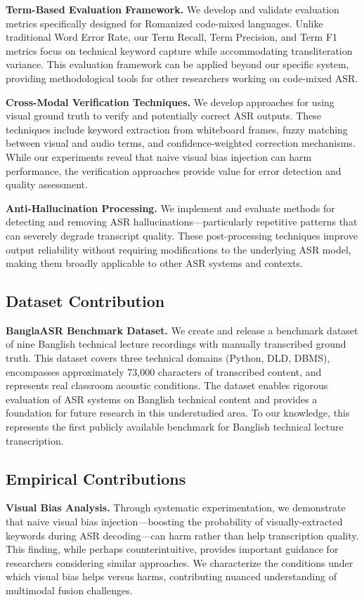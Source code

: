 \textbf{Term-Based Evaluation Framework.} We develop and validate evaluation metrics specifically designed for Romanized code-mixed languages. Unlike traditional Word Error Rate, our Term Recall, Term Precision, and Term F1 metrics focus on technical keyword capture while accommodating transliteration variance. This evaluation framework can be applied beyond our specific system, providing methodological tools for other researchers working on code-mixed ASR.

\textbf{Cross-Modal Verification Techniques.} We develop approaches for using visual ground truth to verify and potentially correct ASR outputs. These techniques include keyword extraction from whiteboard frames, fuzzy matching between visual and audio terms, and confidence-weighted correction mechanisms. While our experiments reveal that naive visual bias injection can harm performance, the verification approaches provide value for error detection and quality assessment.

\textbf{Anti-Hallucination Processing.} We implement and evaluate methods for detecting and removing ASR hallucinations---particularly repetitive patterns that can severely degrade transcript quality. These post-processing techniques improve output reliability without requiring modifications to the underlying ASR model, making them broadly applicable to other ASR systems and contexts.

\subsection{Dataset Contribution}

\textbf{BanglaASR Benchmark Dataset.} We create and release a benchmark dataset of nine Banglish technical lecture recordings with manually transcribed ground truth. This dataset covers three technical domains (Python, DLD, DBMS), encompasses approximately 73,000 characters of transcribed content, and represents real classroom acoustic conditions. The dataset enables rigorous evaluation of ASR systems on Banglish technical content and provides a foundation for future research in this understudied area. To our knowledge, this represents the first publicly available benchmark for Banglish technical lecture transcription.

\subsection{Empirical Contributions}

\textbf{Visual Bias Analysis.} Through systematic experimentation, we demonstrate that naive visual bias injection---boosting the probability of visually-extracted keywords during ASR decoding---can harm rather than help transcription quality. This finding, while perhaps counterintuitive, provides important guidance for researchers considering similar approaches. We characterize the conditions under which visual bias helps versus harms, contributing nuanced understanding of multimodal fusion challenges.

